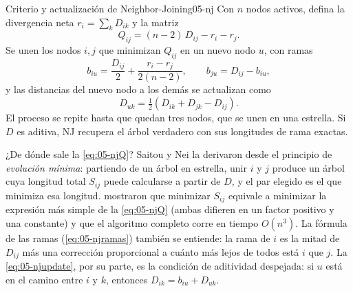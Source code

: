 \begin{teorema}{Criterio y actualización de Neighbor-Joining}{05-nj}
Con $n$ nodos activos, defina la divergencia neta $r_i=\sum_{k}D_{ik}$ y la matriz
\begin{equation}\label{eq:05-njQ}
Q_{ij} = (n-2)\,D_{ij} - r_i - r_j .
\end{equation}
Se unen los nodos $i,j$ que minimizan $Q_{ij}$ en un nuevo nodo $u$, con ramas
\begin{equation}\label{eq:05-njramas}
b_{iu} = \frac{D_{ij}}{2} + \frac{r_i - r_j}{2(n-2)},\qquad b_{ju} = D_{ij} - b_{iu},
\end{equation}
y las distancias del nuevo nodo a los demás se actualizan como
\begin{equation}\label{eq:05-njupdate}
D_{uk} = \tfrac12\left(D_{ik}+D_{jk}-D_{ij}\right).
\end{equation}
El proceso se repite hasta que quedan tres nodos, que se unen en una estrella. Si $D$ es aditiva, NJ recupera el árbol verdadero con sus longitudes de rama exactas.
\end{teorema}

\begin{simbolos}
\end{simbolos}

¿De dónde sale la \cref{eq:05-njQ}? Saitou y Nei la derivaron desde el principio de \emph{evolución mínima}: partiendo de un árbol en estrella, unir $i$ y $j$ produce un árbol cuya longitud total $S_{ij}$ puede calcularse a partir de $D$, y el par elegido es el que minimiza esa longitud. \textcite{c05-studier1988} mostraron que minimizar $S_{ij}$ equivale a minimizar la expresión más simple de la \cref{eq:05-njQ} (ambas difieren en un factor positivo y una constante) y que el algoritmo completo corre en tiempo $O(n^3)$. La fórmula de las ramas (\cref{eq:05-njramas}) también se entiende: la rama de $i$ es la mitad de $D_{ij}$ más una corrección proporcional a cuánto más lejos de todos está $i$ que $j$. La \cref{eq:05-njupdate}, por su parte, es la condición de aditividad despejada: si $u$ está en el camino entre $i$ y $k$, entonces $D_{ik}=b_{iu}+D_{uk}$.

